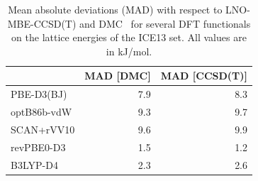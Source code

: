 \begin{table}[h]

\caption{\label{tab:ice13_dft_elatt_mad}Mean absolute deviations (MAD) with respect to LNO-MBE-CCSD(T) and DMC~\cite{dellapiaDMCICE13AmbientHigh2022b} for several DFT functionals on the lattice energies of the ICE13 set. All values are in kJ/mol.}
\begin{tabular}{lrr}
\toprule
 & MAD [DMC] & MAD [CCSD(T)] \\ 
\midrule
PBE-D3(BJ) & 7.9 & 8.3 \\
optB86b-vdW & 9.3 & 9.7 \\
SCAN+rVV10 & 9.6 & 9.9 \\
revPBE0-D3 & 1.5 & 1.2 \\
B3LYP-D4 & 2.3 & 2.6 \\
\bottomrule
\end{tabular}

\end{table}